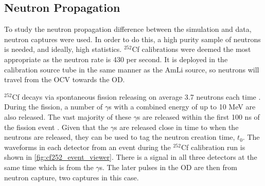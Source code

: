 \subsection{Neutron Propagation}
\par
To study the neutron propagation difference between the simulation and data, neutron captures were used.
In order to do this, a high purity sample of neutrons is needed, and ideally, high statistics.
${}^{252}$Cf calibrations were deemed the most appropriate as the neutron rate is 430 per second.
It is deployed in the calibration source tube in the same manner as the AmLi source, so neutrons will travel from the OCV towards the OD.
\par
${}^{252}$Cf decays via spontaneous fission releasing on average 3.7 neutrons each time \cite{californium252_ref}.
During the fission, a number of $\gamma$s with a combined energy of up to 10 MeV are also released.
The vast majority of these $\gamma$s are released within the first 100 ns of the fission event \cite{cf252_fission_ref,californium_spectra_ref}.
Given that the $\gamma$s are released close in time to when the neutrons are released, they can be used to tag the neutron creation time, $t_0$.
The waveforms in each detector from an event during the ${}^{252}$Cf calibration run is shown in \autoref{fig:cf252_event_viewer}.
There is a signal in all three detectors at the same time which is from the $\gamma$s.
The later pulses in the OD are then from neutron capture, two captures in this case.


